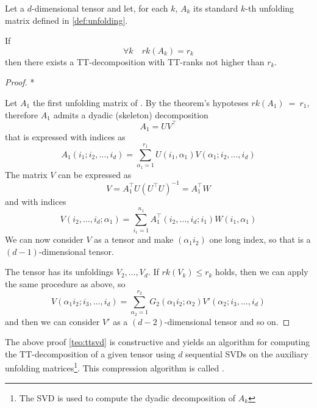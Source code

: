 \begin{Teo} \label{teo:ttsvd}
  Let \A a $d$-dimensional tensor and let, for each $k$, $A_k$ its standard $k$-th unfolding matrix defined in \ref{def:unfolding}.

  If
  \begin{equation*}
    \forall k \quad rk(A_k) = r_k
  \end{equation*}
  then there exists a TT-decomposition with TT-ranks not higher than $r_k$.

  \begin{proof}
    *

    Let $A_1$ the first unfolding matrix of \A. By the theorem's hypoteses $rk(A_1)~=~r_1$, therefore $A_1$ admits a dyadic (skeleton) decomposition
    \begin{equation*}
      A_1 = UV^\top
    \end{equation*}
    that is expressed with indices as
    \begin{equation*}
      A_1(i_1;i_2,\ldots,i_d) = \sum_{\alpha_1 = 1}^{r_1} U(i_1,\alpha_1) V(\alpha_1;i_2,\ldots,i_d)
    \end{equation*}
    The matrix $V$ can be expressed as
    \begin{equation*}
      V = A_1^\top U (U^\top U)^{-1} = A_1^\top W
    \end{equation*}
    and with indices
    \begin{equation*}
      V(i_2,\ldots,i_d;\alpha_1) = \sum_{i_1 = 1}^{n_1} A_1^\top(i_2,\ldots,i_d;i_1) W(i_1,\alpha_1)
    \end{equation*}
    We can now consider $V$ as a tensor and make $(\alpha_1 i_2)$ one long index, so that \V is a $(d-1)$-dimensional tensor.

    The tensor \V has its unfoldings $V_2,\ldots,V_d$. If $rk(V_k) \leq r_k$ holds, then we can apply the same procedure as above, so
    \begin{equation*}
      V(\alpha_1 i_2;i_3,\ldots,i_d) = \sum_{\alpha_2=1}^{r_2} G_2(\alpha_1 i_2;\alpha_2) V'(\alpha_2;i_3,\ldots,i_d)
    \end{equation*}
    and then we can consider $V'$ as a $(d-2)$-dimensional tensor and so on.
    
  \end{proof}
  
\end{Teo}

The above proof \ref{teo:ttsvd} is constructive and yields an algorithm for computing the TT-decomposition of a given tensor using $d$ sequential SVDs on the auxiliary unfolding matrices\footnote{The SVD is used to compute the dyadic decomposition of $A_k$}. This  compression algorithm is called .

